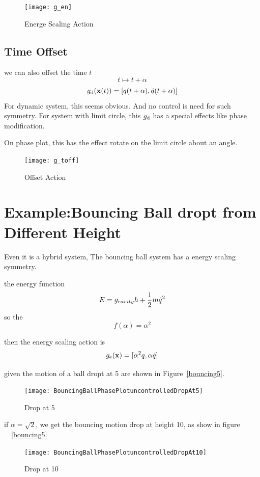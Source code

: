 \begin{figure}[!htbp]
  \begin{center}
      \texttt{[image: g\_en]}
    \caption{Energe Scaling Action}
    \label{fig:gen}
\end{center}
\end{figure}


\subsection*{Time Offset}
we can also offset the time $t$
\[
t \mapsto t+\alpha
\]
\[
g_{\mathrm{d}}(\mathbf{x}(t))=[q(t+\alpha),\dot{q}(t+\alpha)]
\]
For dynamic system, this seems obvious. And no control is need for such symmetry.
For system with limit circle, this $g_{\mathrm{d}}$ has a special effects like phase modification.

On phase plot, this has the effect rotate on the limit circle about an angle.
\begin{figure}[!htbp]
  \begin{center}
      \texttt{[image: g\_toff]}
    \caption{Offset Action}
    \label{fig:gtoff}
\end{center}
\end{figure}





\section{Example:Bouncing Ball dropt from Different Height}
Even it is a hybrid system,
The bouncing ball system has a energy scaling symmetry.

the energy function 
\[
E=g_{ravity}h+\frac{1}{2}m\dot{q}^2
\]
so the 
\[
f(\alpha)=\alpha^2
\]

then the energy scaling action is
\[
g_{\mathrm{e}}(\mathbf{x})=[\alpha^2 q, \alpha \dot{q}]
\]

given the motion of a ball dropt at 5 are shown in Figure~\ref{bouncing5}.


\begin{figure}[!htbp]
  \begin{center}
      \texttt{[image: BouncingBallPhasePlotuncontrolledDropAt5]}
    \caption{Drop at 5}
    \label{fig:bouncing5}
\end{center}
\end{figure}

if $\alpha=\sqrt{2}$, we get the bouncing motion drop at height 10, as show in figure ~~\ref{bouncing5}
\begin{figure}[!htbp]
  \begin{center}
      \texttt{[image: BouncingBallPhasePlotuncontrolledDropAt10]}
    \caption{Drop at 10}
    \label{fig:bouncing10}
\end{center}
\end{figure}


